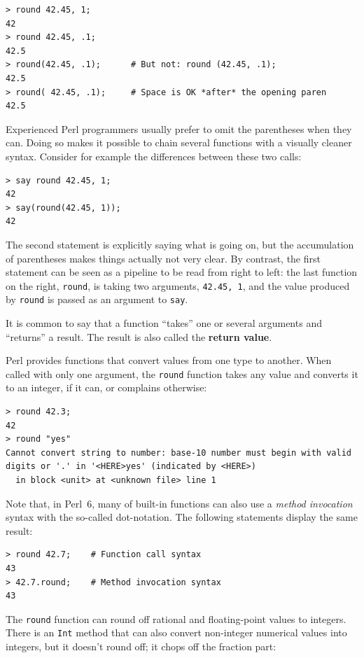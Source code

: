 \begin{verbatim}
> round 42.45, 1;
42
> round 42.45, .1;
42.5
> round(42.45, .1);      # But not: round (42.45, .1);
42.5
> round( 42.45, .1);     # Space is OK *after* the opening paren
42.5
\end{verbatim}

Experienced Perl programmers usually prefer to omit the parentheses 
when they can. Doing so makes it possible to chain several functions 
with a visually cleaner syntax. Consider for example the differences 
between these two calls:

\begin{verbatim}
> say round 42.45, 1;
42
> say(round(42.45, 1));
42
\end{verbatim}

The second statement is explicitly saying what is going on, but 
the accumulation of parentheses makes things actually 
not very clear. By contrast, the first statement can be seen 
as a pipeline to be read from right to left: the last function 
on the right, {\tt round}, is taking two arguments, 
{\tt 42.45, 1}, and the value produced by {\tt round} is 
passed as an argument to {\tt say}.

It is common to say that a function ``takes'' one or 
several arguments and ``returns'' a result.  The result is 
also called the {\bf return value}.

Perl provides functions that convert values from one type 
to another.  When called with only one argument, the 
{\tt round} function takes any value and converts it to an 
integer, if it can, or complains otherwise:

\begin{verbatim}
> round 42.3;
42
> round "yes"
Cannot convert string to number: base-10 number must begin with valid 
digits or '.' in '<HERE>yes' (indicated by <HERE>)
  in block <unit> at <unknown file> line 1
\end{verbatim}

%
Note that, in Perl~6, many of built-in functions can also 
use a \emph{method invocation} syntax with the so-called 
dot-notation. The following statements display the same result:
\begin{verbatim}
> round 42.7;    # Function call syntax
43
> 42.7.round;    # Method invocation syntax
43
\end{verbatim}
%
The {\tt round} function can round off rational and 
floating-point values to integers. There is an {\tt Int} 
method that can also convert non-integer numerical values 
into integers, but it doesn't round off; it chops off the 
fraction part:

